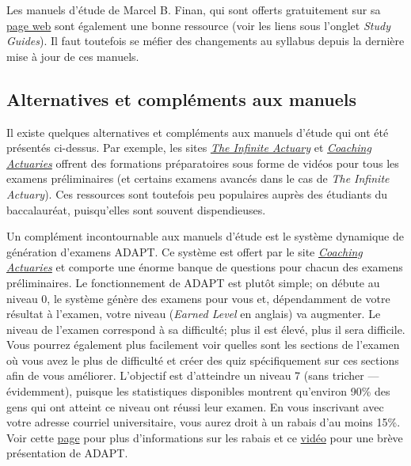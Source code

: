 \documentclass[11pt,french]{article}
\begin{document}
Les manuels d'étude de Marcel B. Finan, qui sont offerts gratuitement sur sa \href{http://faculty.atu.edu/mfinan/actuaries.html}{page web} sont également une bonne ressource (voir les liens sous l'onglet \emph{Study Guides}). Il faut toutefois se méfier des changements au syllabus depuis la dernière mise à jour de ces manuels.


\subsection*{Alternatives et compléments aux manuels}
\label{subsec:alternatives}
Il existe quelques alternatives et compléments aux manuels d'étude qui ont été présentés ci-dessus. Par exemple, les sites \href{http://www.theinfiniteactuary.com/}{\emph{The Infinite Actuary}} et \href{https://www.coachingactuaries.com/}{\emph{Coaching Actuaries}} offrent des formations préparatoires sous forme de vidéos pour tous les examens préliminaires (et certains examens avancés dans le cas de \emph{The Infinite Actuary}). Ces ressources sont toutefois peu populaires auprès des étudiants du baccalauréat, puisqu'elles sont souvent dispendieuses.\vspace{\baselineskip}

Un complément incontournable aux manuels d'étude est le système dynamique de génération d'examens ADAPT. Ce système est offert par le site \href{https://www.coachingactuaries.com/}{\emph{Coaching Actuaries}} et comporte une énorme banque de questions pour chacun des examens préliminaires. Le fonctionnement de ADAPT est plutôt simple; on débute au niveau 0, le système génère des examens pour vous et, dépendamment de votre résultat à l'examen, votre niveau (\emph{Earned Level} en anglais) va augmenter. Le niveau de l'examen correspond à sa difficulté; plus il est élevé, plus il sera difficile. Vous pourrez également plus facilement voir quelles sont les sections de l'examen où vous avez le plus de difficulté et créer des quiz spécifiquement sur ces sections afin de vous améliorer. L'objectif est d'atteindre un niveau 7 (sans tricher --- évidemment), puisque les statistiques disponibles montrent qu'environ 90\% des gens qui ont atteint ce niveau ont réussi leur examen. En vous inscrivant avec votre adresse courriel universitaire, vous aurez droit à un rabais d'au moins 15\%. Voir cette \href{https://www.coachingactuaries.com/Students}{page} pour plus d'informations sur les rabais et ce \href{https://www.youtube.com/watch?v=ZBxLa2J5jhs}{vidéo} pour une brève présentation de ADAPT.
\end{document}
